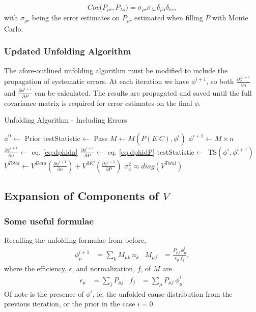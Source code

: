 \begin{equation} \label{eq:CovPPPoisson}
Cov \big( P_{\rho r}, P_{\lambda s} \big) =
   \sigma_{\rho r} \sigma_{\lambda s} \delta_{\rho \lambda} \delta_{rs},
\end{equation}
with $\sigma_{\rho r}$ being the error estimates on $P_{\rho r}$ estimated when filling $P$ with Monte Carlo.

\subsubsection{Updated Unfolding Algorithm}

The afore-outlined unfolding algorithm must be modified to include the propagation of systematic errors.
At each iteration we have $\phi^{i+1}$, so both $\frac{\partial \phi^{i+1}}{\partial n}$ and $\frac{\partial \phi^{i+1}}{\partial P}$
can be calculated. The results are propagated and saved until the full covariance matrix is required for error estimates on the final $\phi$.

\begin{algorithm}
  \caption{Unfolding Algorithm - Including Errors}
  \begin{algorithmic}
  	\State $\phi^{0}\gets$ Prior
	\State testStatistic$\gets$ Pass
		\State $M\gets M(P(E|C),\phi^{i})$
		\State $\phi^{i+1}\gets M \times n$
		\State $\frac{\partial \phi^{i+1}}{\partial n}\gets$ eq. \ref{eq:dphidn}
		\State $\frac{\partial \phi^{i+1}}{\partial P}\gets$ eq. \ref{eq:dphidP}
		\State testStatistic$\gets$ TS$(\phi^{i},\phi^{i+1})$
	\EndWhile
	\State $V^{Total}\gets V^{Data}(\frac{\partial \phi^{i+1}}{\partial n})+V^{MC}(\frac{\partial \phi^{i+1}}{\partial P})$
	\State $\sigma^{2}_{\phi} \approx diag(V^{Total})$
  \end{algorithmic}
\end{algorithm}


\subsection{Expansion of Components of $V$}\label{adye_full_derivation}

\subsubsection{Some useful formulae}
Recalling the unfolding formulae from before,
\begin{align*}
	\phi^{i+1}_{\mu} &= \sum_{k}{M_{\mu k} \, n_{k}}
	&
	M_{\mu j} &= \frac{ P_{\mu j} \, \phi^{i}_{\mu} }{ \epsilon_{\mu} \, f_{j}},
\end{align*}
where the efficiency, $\epsilon$, and normalization, $f$, of $M$ are
\begin{align*} %
	\epsilon_{\mu} &= \sum_{j} {P_{\mu j}}
	&
	f_{j} &= \sum_{\mu}{P_{\mu j} \, \phi^{i}_{\mu}}.
\end{align*}
Of note is the presence of $\phi^{i}$, ie, the unfolded cause distribution from the previous iteration, or the 
prior in the case $i=0$.

